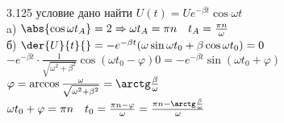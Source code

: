\testCom
{%
	3.125
}
{%
	условие
}
{%
	дано
}
{%
	найти
}
{%
	$U(t) = U e^{- \beta t} \cos \omega t$\\
	a) $\abs{\cos \omega t_A} = 2 \Rightarrow \omega t_A = \pi n \quad t_A = \frac{\pi n}{\omega}$\\
	б) $\der{U}{t}{} = - e^{- \beta t} (\omega \sin \omega t_0 + \beta \cos \omega t_0) = 0$\\
	$- e^{- \beta t} \cdot \frac{1}{\sqrt{\omega^2 + \beta^2}} \cos (\omega t_0 - \varphi) 0 = - e^{- \beta t} \sin (\omega t_0 + \varphi)$\\
	$\varphi = \arccos \frac{\omega}{\sqrt{\omega^2 + \beta^2}} = \arctg \frac{\beta}{\omega}$\\
	$\omega t_0 + \varphi = \pi n \quad t_0 = \frac{\pi n - \varphi}{\omega} = \frac{\pi n - \arctg \frac{\beta}{\omega}}{\omega}$\\
}

